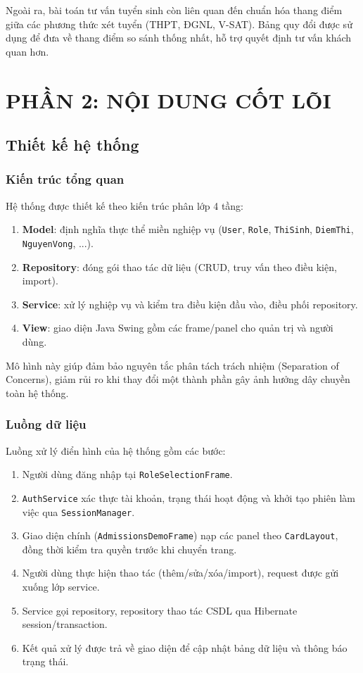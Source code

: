 \documentclass[12pt,a4paper,oneside]{report}
\begin{document}
Ngoài ra, bài toán tư vấn tuyển sinh còn liên quan đến chuẩn hóa thang điểm giữa các phương thức xét tuyển (THPT, ĐGNL, V-SAT). Bảng quy đổi được sử dụng để đưa về thang điểm so sánh thống nhất, hỗ trợ quyết định tư vấn khách quan hơn.

\part*{PHẦN 2: NỘI DUNG CỐT LÕI}

\chapter{Thiết kế hệ thống}
\section{Kiến trúc tổng quan}
Hệ thống được thiết kế theo kiến trúc phân lớp 4 tầng:
\begin{enumerate}
  \item \textbf{Model}: định nghĩa thực thể miền nghiệp vụ (\texttt{User}, \texttt{Role}, \texttt{ThiSinh}, \texttt{DiemThi}, \texttt{NguyenVong}, ...).
  \item \textbf{Repository}: đóng gói thao tác dữ liệu (CRUD, truy vấn theo điều kiện, import).
  \item \textbf{Service}: xử lý nghiệp vụ và kiểm tra điều kiện đầu vào, điều phối repository.
  \item \textbf{View}: giao diện Java Swing gồm các frame/panel cho quản trị và người dùng.
\end{enumerate}

Mô hình này giúp đảm bảo nguyên tắc phân tách trách nhiệm (Separation of Concerns), giảm rủi ro khi thay đổi một thành phần gây ảnh hưởng dây chuyền toàn hệ thống.

\section{Luồng dữ liệu}
Luồng xử lý điển hình của hệ thống gồm các bước:
\begin{enumerate}
  \item Người dùng đăng nhập tại \texttt{RoleSelectionFrame}.
  \item \texttt{AuthService} xác thực tài khoản, trạng thái hoạt động và khởi tạo phiên làm việc qua \texttt{SessionManager}.
  \item Giao diện chính (\texttt{AdmissionsDemoFrame}) nạp các panel theo \texttt{CardLayout}, đồng thời kiểm tra quyền trước khi chuyển trang.
  \item Người dùng thực hiện thao tác (thêm/sửa/xóa/import), request được gửi xuống lớp service.
  \item Service gọi repository, repository thao tác CSDL qua Hibernate session/transaction.
  \item Kết quả xử lý được trả về giao diện để cập nhật bảng dữ liệu và thông báo trạng thái.
\end{enumerate}
\end{document}
